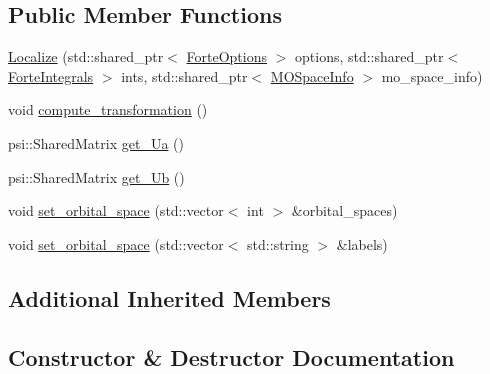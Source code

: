 \subsection*{Public Member Functions}
\begin{DoxyCompactItemize}
\item 
\mbox{\hyperlink{classforte_1_1_localize_adc1373ddd714f156d6b9134364900266}{Localize}} (std\+::shared\+\_\+ptr$<$ \mbox{\hyperlink{classforte_1_1_forte_options}{Forte\+Options}} $>$ options, std\+::shared\+\_\+ptr$<$ \mbox{\hyperlink{classforte_1_1_forte_integrals}{Forte\+Integrals}} $>$ ints, std\+::shared\+\_\+ptr$<$ \mbox{\hyperlink{classforte_1_1_m_o_space_info}{M\+O\+Space\+Info}} $>$ mo\+\_\+space\+\_\+info)
\item 
void \mbox{\hyperlink{classforte_1_1_localize_af4858fdaa807659ad06d30925038a4c1}{compute\+\_\+transformation}} ()
\item 
psi\+::\+Shared\+Matrix \mbox{\hyperlink{classforte_1_1_localize_a9ee389a31b8856a670ff4854906979af}{get\+\_\+\+Ua}} ()
\item 
psi\+::\+Shared\+Matrix \mbox{\hyperlink{classforte_1_1_localize_add8ecbbd32ef5910a229d6a7225b4be9}{get\+\_\+\+Ub}} ()
\item 
void \mbox{\hyperlink{classforte_1_1_localize_aad7798a16102c6a3d38ba62bcbc7f500}{set\+\_\+orbital\+\_\+space}} (std\+::vector$<$ int $>$ \&orbital\+\_\+spaces)
\item 
void \mbox{\hyperlink{classforte_1_1_localize_ae48978e53ec6af850793b8821797d877}{set\+\_\+orbital\+\_\+space}} (std\+::vector$<$ std\+::string $>$ \&labels)
\end{DoxyCompactItemize}
\subsection*{Additional Inherited Members}


\subsection{Constructor \& Destructor Documentation}
\mbox{\label{classforte_1_1_localize_adc1373ddd714f156d6b9134364900266}} 
